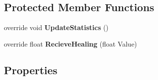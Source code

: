 \subsection*{Protected Member Functions}
\begin{DoxyCompactItemize}
\item 
\hypertarget{class_t_creature_a8126c06e7c10d622826dcd165743aa66}{}override void {\bfseries Update\+Statistics} ()\label{class_t_creature_a8126c06e7c10d622826dcd165743aa66}

\item 
\hypertarget{class_t_creature_a7ecc901d6aaf6d0dca29e954909f0ba9}{}override float {\bfseries Recieve\+Healing} (float Value)\label{class_t_creature_a7ecc901d6aaf6d0dca29e954909f0ba9}

\end{DoxyCompactItemize}
\subsection*{Properties}
